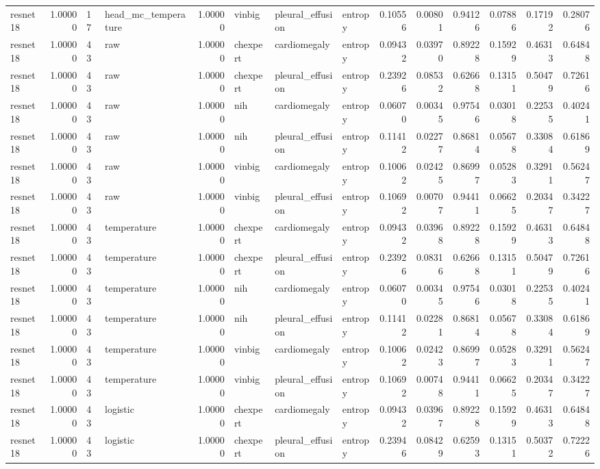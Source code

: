 \begin{tabular}{lrllrlllrrrrrr}
resnet18 & 1.00000 & 17 & head\_mc\_temperature & 1.00000 & vinbig & pleural\_effusion & entropy & 0.10556 & 0.00801 & 0.94126 & 0.07886 & 0.17192 & 0.28076 \\
resnet18 & 1.00000 & 43 & raw & 1.00000 & chexpert & cardiomegaly & entropy & 0.09432 & 0.03970 & 0.89228 & 0.15929 & 0.46313 & 0.64848 \\
resnet18 & 1.00000 & 43 & raw & 1.00000 & chexpert & pleural\_effusion & entropy & 0.23926 & 0.08532 & 0.62668 & 0.13151 & 0.50479 & 0.72616 \\
resnet18 & 1.00000 & 43 & raw & 1.00000 & nih & cardiomegaly & entropy & 0.06070 & 0.00345 & 0.97546 & 0.03018 & 0.22535 & 0.40241 \\
resnet18 & 1.00000 & 43 & raw & 1.00000 & nih & pleural\_effusion & entropy & 0.11412 & 0.02277 & 0.86814 & 0.05678 & 0.33084 & 0.61869 \\
resnet18 & 1.00000 & 43 & raw & 1.00000 & vinbig & cardiomegaly & entropy & 0.10062 & 0.02425 & 0.86997 & 0.05283 & 0.32911 & 0.56247 \\
resnet18 & 1.00000 & 43 & raw & 1.00000 & vinbig & pleural\_effusion & entropy & 0.10692 & 0.00707 & 0.94411 & 0.06625 & 0.20347 & 0.34227 \\
resnet18 & 1.00000 & 43 & temperature & 1.00000 & chexpert & cardiomegaly & entropy & 0.09432 & 0.03968 & 0.89228 & 0.15929 & 0.46313 & 0.64848 \\
resnet18 & 1.00000 & 43 & temperature & 1.00000 & chexpert & pleural\_effusion & entropy & 0.23926 & 0.08316 & 0.62668 & 0.13151 & 0.50479 & 0.72616 \\
resnet18 & 1.00000 & 43 & temperature & 1.00000 & nih & cardiomegaly & entropy & 0.06070 & 0.00345 & 0.97546 & 0.03018 & 0.22535 & 0.40241 \\
resnet18 & 1.00000 & 43 & temperature & 1.00000 & nih & pleural\_effusion & entropy & 0.11412 & 0.02281 & 0.86814 & 0.05678 & 0.33084 & 0.61869 \\
resnet18 & 1.00000 & 43 & temperature & 1.00000 & vinbig & cardiomegaly & entropy & 0.10062 & 0.02423 & 0.86997 & 0.05283 & 0.32911 & 0.56247 \\
resnet18 & 1.00000 & 43 & temperature & 1.00000 & vinbig & pleural\_effusion & entropy & 0.10692 & 0.00748 & 0.94411 & 0.06625 & 0.20347 & 0.34227 \\
resnet18 & 1.00000 & 43 & logistic & 1.00000 & chexpert & cardiomegaly & entropy & 0.09432 & 0.03967 & 0.89228 & 0.15929 & 0.46313 & 0.64848 \\
resnet18 & 1.00000 & 43 & logistic & 1.00000 & chexpert & pleural\_effusion & entropy & 0.23946 & 0.08429 & 0.62593 & 0.13151 & 0.50372 & 0.72226 \\

\end{tabular}
